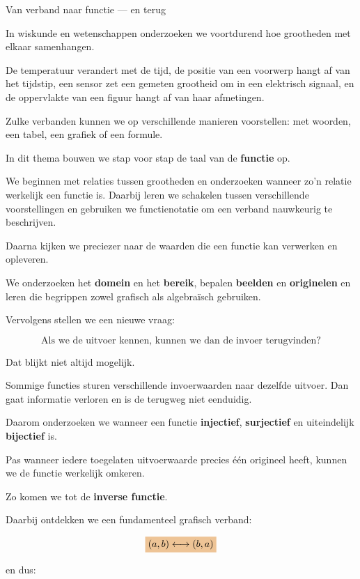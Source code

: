 \documentclass{xourse}
\begin{document}
\begin{themaintro}{Van verband naar functie — en terug}

  In wiskunde en wetenschappen onderzoeken we voortdurend
  hoe grootheden met elkaar samenhangen.

  De temperatuur verandert met de tijd,
  de positie van een voorwerp hangt af van het tijdstip,
  een sensor zet een gemeten grootheid om in een elektrisch signaal,
  en de oppervlakte van een figuur hangt af van haar afmetingen.

  Zulke verbanden kunnen we op verschillende manieren voorstellen:
  met woorden, een tabel, een grafiek of een formule.

  In dit thema bouwen we stap voor stap de taal van de
  \textbf{functie} op.

  We beginnen met relaties tussen grootheden en onderzoeken
  wanneer zo'n relatie werkelijk een functie is.
  Daarbij leren we schakelen tussen verschillende voorstellingen
  en gebruiken we functienotatie om een verband nauwkeurig te beschrijven.

  Daarna kijken we preciezer naar de waarden die een functie kan verwerken
  en opleveren.

  We onderzoeken het \textbf{domein} en het \textbf{bereik},
  bepalen \textbf{beelden} en \textbf{originelen}
  en leren die begrippen zowel grafisch als algebraïsch gebruiken.

  Vervolgens stellen we een nieuwe vraag:

  \[
  \text{Als we de uitvoer kennen, kunnen we dan de invoer terugvinden?}
  \]

  Dat blijkt niet altijd mogelijk.

  Sommige functies sturen verschillende invoerwaarden naar dezelfde uitvoer.
  Dan gaat informatie verloren en is de terugweg niet eenduidig.

  Daarom onderzoeken we wanneer een functie
  \textbf{injectief}, \textbf{surjectief} en uiteindelijk
  \textbf{bijectief} is.

  Pas wanneer iedere toegelaten uitvoerwaarde
  precies één origineel heeft,
  kunnen we de functie werkelijk omkeren.

  Zo komen we tot de \textbf{inverse functie}.

  Daarbij ontdekken we een fundamenteel grafisch verband:

  \[
  \important{
    (a,b)
    \longleftrightarrow
    (b,a)
  }
  \]

  en dus:


\end{themaintro}
\end{document}
